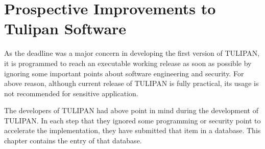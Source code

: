 \chapter{Prospective Improvements to Tulipan Software}
\begin{flushright}\end{flushright}

As the deadline was a major concern in developing the first version of TULIPAN, it is programmed to reach an executable working release as soon as possible by ignoring some important points about software engineering and security. For above reason, although current release of TULIPAN is fully practical, its usage is not recommended for sensitive application.

The developers of TULIPAN had above point in mind during the development of TULIPAN. In each step that they ignored some programming or security point to accelerate the implementation, they have submitted that item in a database. This chapter contains the entry of that database.

